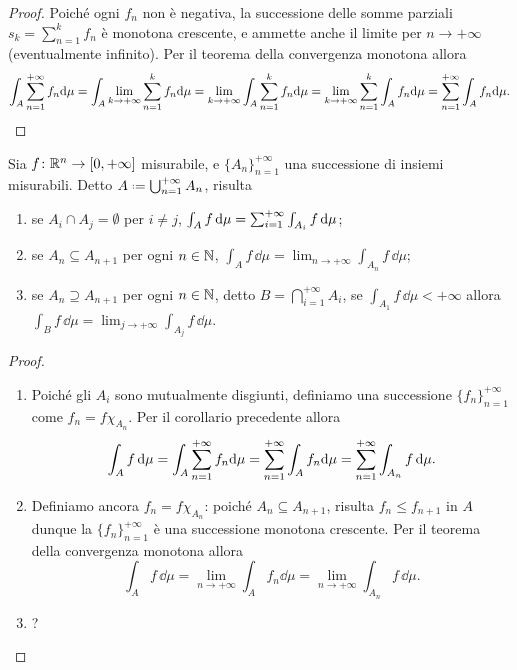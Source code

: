 \begin{proof}
	Poich\'e ogni $f_n$ non è negativa, la successione delle somme parziali $s_k=\sum_{n=1}^kf_n$ è monotona crescente, e ammette anche il limite per $n\to+\infty$ (eventualmente infinito).
	Per il teorema della convergenza monotona allora
	\begin{equation}
		\int_A\sum_{{n}=1}^{+\infty}f_n\textup{d}\mu=\int_A\lim_{k\to+\infty}\sum_{n=1}^kf_n\textup{d}\mu=\lim_{k\to+\infty}\int_A\sum_{n=1}^kf_n\textup{d}\mu=\lim_{k\to+\infty}\sum_{n=1}^k\int_Af_n\textup{d}\mu=\sum_{{n}=1}^{+\infty}\int_Af_n\textup{d}\mu.\qedhere
	\end{equation}
\end{proof}
\begin{corollario}
	Sia $f\colon\mathbb{R}^n\to[0,+\infty]$ misurabile, e $\{A_n\}_{n=1}^{+\infty}$ una successione di insiemi misurabili.
	Detto $A\defeq\bigcup_{n=1}^{+\infty}A_n$, risulta
	\begin{enumerate}
		\item se $A_i\cap A_j=\emptyset$ per $i\neq j$, $\int_Af\,\textup{d}\mu=\sum_{{i}=1}^{+\infty}\int_{A_i}f\,\textup{d}\mu$;
		\item se $A_n\subseteq A_{n+1}$ per ogni $n\in\mathbb{N}$, $\int_Af\,\dd\mu=\lim_{n\to+\infty}\int_{A_n}f\,\dd\mu$;
		\item se $A_n\supseteq A_{n+1}$ per ogni $n\in\mathbb{N}$, detto $B=\bigcap_{i=1}^{+\infty}A_i$, se $\int_{A_1}f\,\dd\mu<+\infty$ allora $\int_Bf\,\dd\mu=\lim_{j\to+\infty}\int_{A_j}f\,\dd\mu$.
	\end{enumerate}
\end{corollario}
\begin{proof}
	\begin{enumerate}
		\item Poich\'e gli $A_i$ sono mutualmente disgiunti, definiamo una successione $\{f_n\}_{n=1}^{+\infty}$ come $f_n=f\chi_{A_n}$.
			Per il corollario precedente allora
			\begin{equation}
				\int_Af\,\textup{d}\mu=\int_A\sum_{{n}=1}^{+\infty}f_n\textup{d}\mu=\sum_{{n}=1}^{+\infty}\int_Af_n\textup{d}\mu=\sum_{{n}=1}^{+\infty}\int_{A_n}f\,\textup{d}\mu.
			\end{equation}
		\item Definiamo ancora $f_n=f\chi_{A_n}$: poich\'e $A_n\subseteq A_{n+1}$, risulta $f_n\leq f_{n+1}$ in $A$ dunque la $\{f_n\}_{n=1}^{+\infty}$ è una successione monotona crescente.
			Per il teorema della convergenza monotona allora
			\begin{equation}
				\int_Af\,\dd\mu=\lim_{n\to+\infty}\int_Af_n\dd\mu=\lim_{n\to+\infty}\int_{A_n}f\,\dd\mu.
			\end{equation}
		\item ?	\qedhere
	\end{enumerate}
\end{proof}

